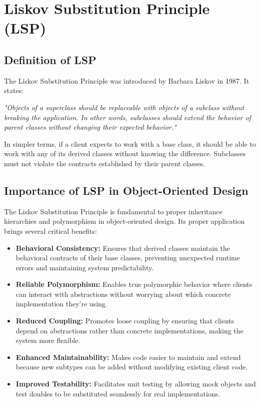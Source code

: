 
\section{Liskov Substitution Principle (LSP)}

\subsection{Definition of LSP}

The Liskov Substitution Principle was introduced by Barbara Liskov in 1987. It states:

\textit{"Objects of a superclass should be replaceable with objects of a subclass without breaking the application. In other words, subclasses should extend the behavior of parent classes without changing their expected behavior."}

In simpler terms, if a client expects to work with a base class, it should be able to work with any of its derived classes without knowing the difference. Subclasses must not violate the contracts established by their parent classes.

\subsection{Importance of LSP in Object-Oriented Design}

The Liskov Substitution Principle is fundamental to proper inheritance hierarchies and polymorphism in object-oriented design. Its proper application brings several critical benefits:

\begin{itemize}
    \item \textbf{Behavioral Consistency:} Ensures that derived classes maintain the behavioral contracts of their base classes, preventing unexpected runtime errors and maintaining system predictability.
    \item \textbf{Reliable Polymorphism:} Enables true polymorphic behavior where clients can interact with abstractions without worrying about which concrete implementation they're using.
    \item \textbf{Reduced Coupling:} Promotes loose coupling by ensuring that clients depend on abstractions rather than concrete implementations, making the system more flexible.
    \item \textbf{Enhanced Maintainability:} Makes code easier to maintain and extend because new subtypes can be added without modifying existing client code.
    \item \textbf{Improved Testability:} Facilitates unit testing by allowing mock objects and test doubles to be substituted seamlessly for real implementations.
\end{itemize}

